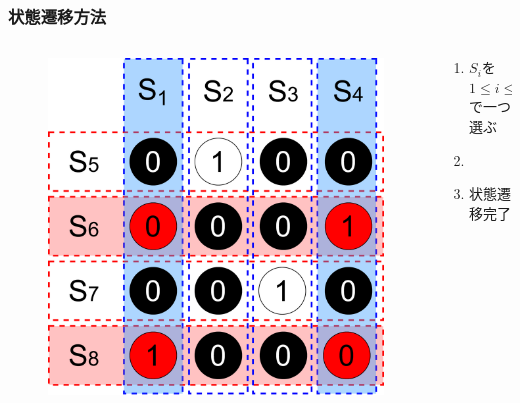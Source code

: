 \begin{frame}
  \frametitle{状態遷移方法}
  \begin{columns}
    \begin{column}{0.6\linewidth}
  \begin{figure}[h]
    \centering
    \includegraphics[width=0.8\linewidth]{data/kanzen2ji_bitflip}
  \end{figure}
    \end{column}
    \begin{column}{0.4\linewidth}
      \begin{enumerate}
        \item $S_i$を$1\leq i \leq 4$で一つ選ぶ
        \item 
        \item 状態遷移完了
      \end{enumerate}
    \end{column}
  \end{columns}
\end{frame}

